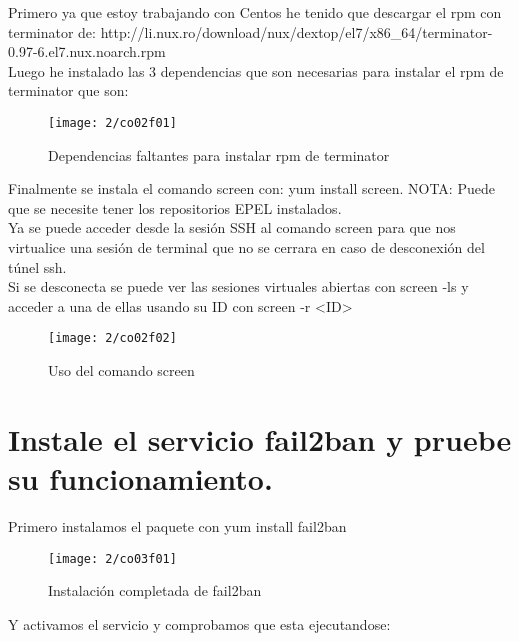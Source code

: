 Primero ya que estoy trabajando con Centos he tenido que descargar el rpm con terminator de: http://li.nux.ro/download/nux/dextop/el7/x86\_64/terminator-0.97-6.el7.nux.noarch.rpm \\

Luego he instalado las 3 dependencias que son necesarias para instalar el rpm de terminator que son:\\

\begin{figure}[H]
	\centering
	\texttt{[image: 2/co02f01]}
	\caption{Dependencias faltantes para instalar rpm de terminator}
	\label{fig:f02}
\end{figure}

Finalmente se instala el comando screen con: yum install screen. NOTA: Puede que se necesite tener los repositorios EPEL instalados. \cite{c01} \\

Ya se puede acceder desde la sesión SSH al comando screen para que nos virtualice una sesión de terminal que no se cerrara en caso de desconexión del túnel ssh. \\
Si se desconecta se puede ver las sesiones virtuales abiertas con screen -ls y acceder a una de ellas usando su ID con screen -r <ID> \cite{c02} \\

\begin{figure}[H]
	\centering
	\texttt{[image: 2/co02f02]}
	\caption{Uso del comando screen}
	\label{fig:f03}
\end{figure}


\section{Instale el servicio fail2ban y pruebe su funcionamiento.}

Primero instalamos el paquete con yum install fail2ban \\

\begin{figure}[H]
	\centering
	\texttt{[image: 2/co03f01]}
	\caption{Instalación completada de fail2ban}
	\label{fig:f04}
\end{figure}

Y activamos el servicio y comprobamos que esta ejecutandose: \\

